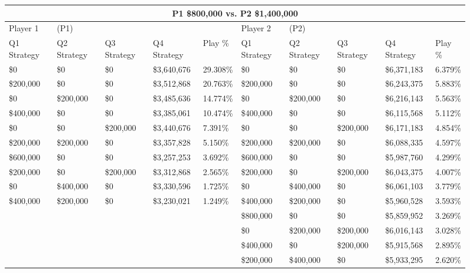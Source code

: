 \documentclass[11pt]{article}
\begin{document}
\begin{figure}
\tiny
\begin{tabular}{ |p{1.0cm}p{1.0cm}p{1.0cm}p{2.0cm}|p{1.0cm}||p{1.0cm}p{1.0cm}p{1.0cm}p{2.0cm}|p{1.0cm}|}
\hline
\multicolumn{10}{|c|}{P1 \$800,000 vs. P2 \$1,400,000} \\
\hline
Player 1 & (P1) & & & & Player 2 & (P2) & & & \\
\hline
Q1 Strategy & Q2 Strategy & Q3 Strategy & Q4 Strategy  &  Play \% & Q1 Strategy & Q2 Strategy & Q3 Strategy & Q4 Strategy  &  Play \%\\
\hline
\$0 & \$0 & \$0 & \$3,640,676 & 29.308\%            & \$0 & \$0 & \$0 & \$6,371,183 & 6.379\% \\
\$200,000 & \$0 & \$0 & \$3,512,868 & 20.763\%      & \$200,000 & \$0 & \$0 & \$6,243,375 & 5.883\% \\
\$0 & \$200,000 & \$0 & \$3,485,636 & 14.774\%      & \$0 & \$200,000 & \$0 & \$6,216,143 & 5.563\% \\
\$400,000 & \$0 & \$0 & \$3,385,061 & 10.474\%      & \$400,000 & \$0 & \$0 & \$6,115,568 & 5.112\% \\
\$0 & \$0 & \$200,000 & \$3,440,676 & 7.391\%       & \$0 & \$0 & \$200,000 & \$6,171,183 & 4.854\% \\
\$200,000 & \$200,000 & \$0 & \$3,357,828 & 5.150\%  & \$200,000 & \$200,000 & \$0 & \$6,088,335 & 4.597\% \\
\$600,000 & \$0 & \$0 & \$3,257,253 & 3.692\%       & \$600,000 & \$0 & \$0 & \$5,987,760 & 4.299\% \\
\$200,000 & \$0 & \$200,000 & \$3,312,868 & 2.565\% & \$200,000 & \$0 & \$200,000 & \$6,043,375 & 4.007\% \\
\$0 & \$400,000 & \$0 & \$3,330,596 & 1.725\%       & \$0 & \$400,000 & \$0 & \$6,061,103 & 3.779\% \\
\$400,000 & \$200,000 & \$0 & \$3,230,021 & 1.249\% & \$400,000 & \$200,000 & \$0 & \$5,960,528 & 3.593\% \\
& & & &                                            & \$800,000 & \$0 & \$0 & \$5,859,952 & 3.269\% \\
& & & &                                            & \$0 & \$200,000 & \$200,000 & \$6,016,143 & 3.028\% \\
& & & &                                            & \$400,000 & \$0 & \$200,000 & \$5,915,568 & 2.895\% \\
& & & &                                            & \$200,000 & \$400,000 & \$0 & \$5,933,295 & 2.620\% \\

\end{tabular}
\end{figure}
\end{document}
